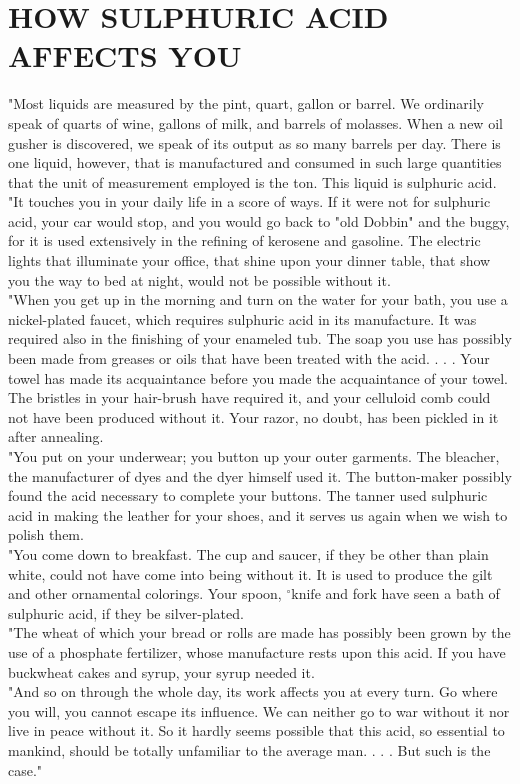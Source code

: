 \documentclass[10pt]{article}
\begin{document}
\section*{HOW SULPHURIC ACID AFFECTS YOU}
"Most liquids are measured by the pint, quart, gallon or barrel. We ordinarily speak of quarts of wine, gallons of milk, and barrels of molasses. When a new oil gusher is discovered, we speak of its output as so many barrels per day. There is one liquid, however, that is manufactured and consumed in such large quantities that the unit of measurement employed is the ton. This liquid is sulphuric acid.\\
"It touches you in your daily life in a score of ways. If it were not for sulphuric acid, your car would stop, and you would go back to "old Dobbin" and the buggy, for it is used extensively in the refining of kerosene and gasoline. The electric lights that illuminate your office, that shine upon your dinner table, that show you the way to bed at night, would not be possible without it.\\
"When you get up in the morning and turn on the water for your bath, you use a nickel-plated faucet, which requires sulphuric acid in its manufacture. It was required also in the finishing of your enameled tub. The soap you use has possibly been made from greases or oils that have been treated with the acid. . . . Your towel has made its acquaintance before you made the acquaintance of your towel. The bristles in your hair-brush have required it, and your celluloid comb could not have been produced without it. Your razor, no doubt, has been pickled in it after annealing.\\
"You put on your underwear; you button up your outer garments. The bleacher, the manufacturer of dyes and the dyer himself used it. The button-maker possibly found the acid necessary to complete your buttons. The tanner used sulphuric acid in making the leather for your shoes, and it serves us again when we wish to polish them.\\
"You come down to breakfast. The cup and saucer, if they be other than plain white, could not have come into being without it. It is used to produce the gilt and other ornamental colorings. Your spoon, ${ }^{\circ} \mathrm{knife}$ and fork have seen a bath of sulphuric acid, if they be silver-plated.\\
"The wheat of which your bread or rolls are made has possibly been grown by the use of a phosphate fertilizer, whose manufacture rests upon this acid. If you have buckwheat cakes and syrup, your syrup needed it.\\
"And so on through the whole day, its work affects you at every turn. Go where you will, you cannot escape its influence. We can neither go to war without it nor live in peace without it. So it hardly seems possible that this acid, so essential to mankind, should be totally unfamiliar to the average man. . . . But such is the case."
\end{document}
